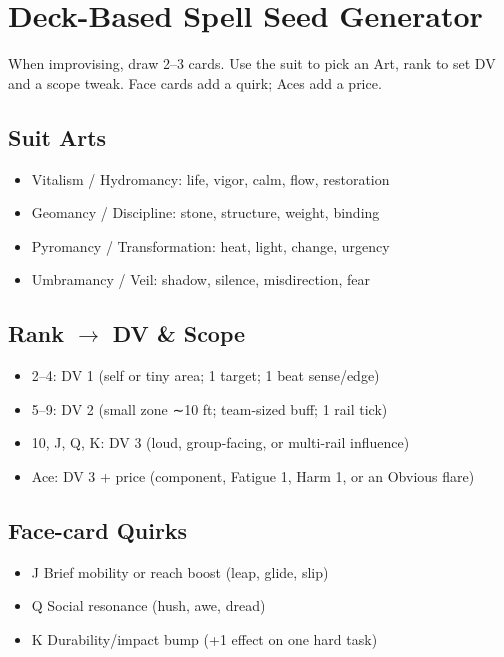 \documentclass[11pt]{report}
\begin{document}
\section{Deck-Based Spell Seed Generator}

When improvising, draw 2--3 cards. Use the suit to pick an Art, rank to set DV and a scope tweak. Face cards add a quirk; Aces add a price.

\subsection{Suit Arts}
\begin{itemize}
    \item \heartsuit Vitalism / Hydromancy: life, vigor, calm, flow, restoration
    \item \clubsuit Geomancy / Discipline: stone, structure, weight, binding
    \item \diamondsuit Pyromancy / Transformation: heat, light, change, urgency
    \item \spadesuit Umbramancy / Veil: shadow, silence, misdirection, fear
\end{itemize}

\subsection{Rank $\rightarrow$ DV \& Scope}
\begin{itemize}
    \item 2--4: DV 1 (self or tiny area; 1 target; 1 beat sense/edge)
    \item 5--9: DV 2 (small zone ∼10 ft; team-sized buff; 1 rail tick)
    \item 10, J, Q, K: DV 3 (loud, group-facing, or multi-rail influence)
    \item Ace: DV 3 + price (component, Fatigue 1, Harm 1, or an Obvious flare)
\end{itemize}

\subsection{Face-card Quirks}
\begin{itemize}
    \item J Brief mobility or reach boost (leap, glide, slip)
    \item Q Social resonance (hush, awe, dread)
    \item K Durability/impact bump (+1 effect on one hard task)
\end{itemize}
\end{document}
